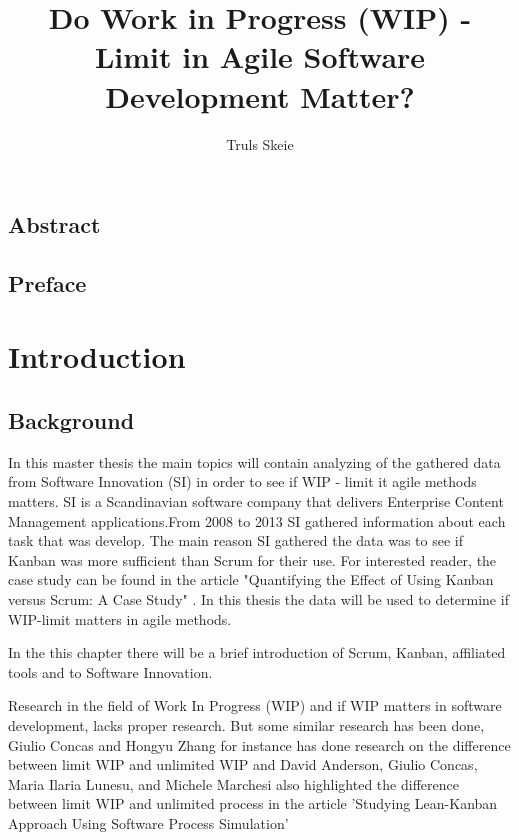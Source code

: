 \documentclass[UKenglish]{ifimaster}  %
\title{Do Work in Progress (WIP) - Limit in Agile Software Development Matter?}        %
\author{Truls Skeie}                      %
\begin{document}
\ififorside{}
\frontmatter{}
\maketitle{}

\chapter*{Abstract}                   %

\tableofcontents{}
\listoffigures{}
\listoftables{}

\chapter*{Preface}                    %

\mainmatter{}
\part{Introduction}                   %
\chapter{Background}  
\label{chap:Background}                %
In this master thesis the main topics will contain analyzing of the gathered data from Software Innovation (SI) in order to see if WIP - limit it agile methods matters. SI is a Scandinavian software company that delivers Enterprise Content Management applications.From 2008 to 2013 SI gathered information about each task that was develop. The main reason SI gathered the data was to see if Kanban was more sufficient than Scrum for their use. For interested reader, the case study can be found in the article "Quantifying the Effect of Using Kanban versus Scrum: A Case Study" \parencite{Dag}. In this thesis the data will be used to determine if WIP-limit matters in agile methods.  

In the this chapter there will be a brief introduction of Scrum, Kanban, affiliated tools and to Software Innovation.

Research in the field of Work In Progress (WIP) and if WIP matters in software development, lacks proper research. But some similar research has been done, Giulio Concas and Hongyu Zhang  for instance has done research on the difference between limit WIP and unlimited WIP  \parencite{SMR:SMR1599} and David Anderson, Giulio Concas, Maria Ilaria Lunesu, and Michele Marchesi also highlighted the difference between limit WIP and unlimited process in the article 'Studying Lean-Kanban Approach Using Software Process Simulation' \parencite{DavidAnderson}
\end{document}
